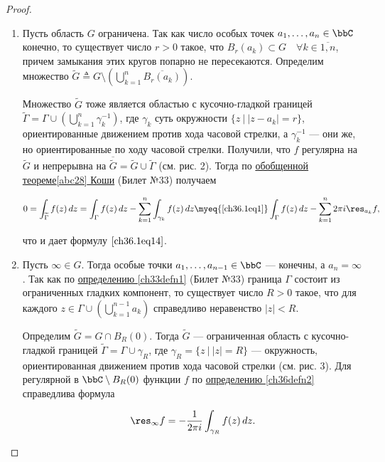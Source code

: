 \begin{proof}
\begin{enumerate}
\item Пусть область $G$ ограничена. Так как число особых точек $a_1,\ldots,a_n \in \bbC$ конечно, то существует число $r > 0$ такое, что $B_r(a_k) \subset G \quad \forall k \in \overline{1,n}$, причем замыкания этих кругов попарно не пересекаются. Определим множество $\widetilde{G} \triangleq G \setminus \left( \bigcup\limits_{k = 1}^{n} \overline{B_r(a_k)}\right)$.

Множество $\widetilde{G}$ тоже является областью с кусочно-гладкой границей $\widetilde{\Gamma} = \Gamma \cup \left( \bigcup\limits_{k = 1}^{n} \gamma_{k}^{-1} \right)$,	где $\gamma_k$ суть окружности $\{ z \: \big| \: |z - a_k| = r \}$, ориентированные движением против хода часовой стрелки, а $\gamma_{k}^{-1}$ --- они же, но ориентированные по ходу часовой стрелки. Получили, что $f$ регулярна на $\widetilde{G}$ и непрерывна на $\overline{\widetilde{G}} = \widetilde{G} \cup \widetilde{\Gamma}$ (см. рис. 2). Тогда по \hyperref[abc28]{обобщенной теореме\ref{abc28} Коши} (Билет №33) получаем

$$
0 = \int_{\widetilde{\Gamma}} f(z) \,dz = \int_{\Gamma} f(z) \,dz - \sum_{k = 1}^{n} \int_{\gamma_k} f(z) \,dz \myeq{\eqref{ch36.1eq1}} \int_{\Gamma} f(z) \,dz - \sum_{k = 1}^{n} 2\pi i \res_{a_k} f,
$$

что и дает формулу $\eqref{ch36.1eq14}$.


\item	Пусть $\infty \in G$. Тогда особые точки $a_1,\ldots,a_{n - 1} \in \bbC$ --- конечны, а $a_n = \infty$. Так как по \hyperref[ch33defn1]{определению \ref{ch33defn1}} (Билет №33) граница $\Gamma$ состоит из ограниченных гладких компонент, то существует число $R > 0$ такое, что для каждого $z \in \Gamma \cup \left( \bigcup\limits_{k = 1}^{n - 1} a_k \right)$ справедливо неравенство $|z| < R$.

Определим $\widetilde{G} = G \cap B_R(0)$. Тогда $\widetilde G$ — ограниченная область с кусочно-гладкой границей $\widetilde{\Gamma} = \Gamma \cup \gamma_R$, где $\gamma_R = \{ z \: \big| \: |z| = R\}$ --- окружность, ориентированная движением против хода часовой стрелки (см. рис. 3). Для регулярной в $\bbC \setminus B_R(0)$ функции $f$ по \hyperref[ch36defn2]{определению \ref{ch36defn2}} справедлива формула

\begin{equation} \label{ch36.1eq15}
\res_{\infty} f = - \frac{1}{2\pi i} \int_{\gamma_R} f(z) \,dz.
\end{equation}



\end{enumerate}
\end{proof}
